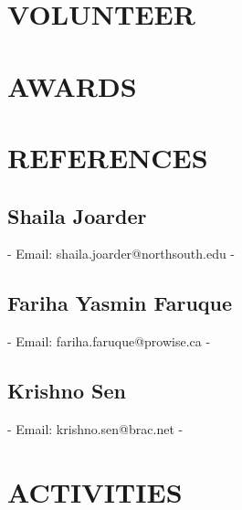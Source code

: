 \begin{minipage}[t]{0.36\textwidth}
    \section{VOLUNTEER} %
      
    \sectionsep

    \section{AWARDS} %
      
    \sectionsep

    \section{REFERENCES} %
      \subsection{Shaila Joarder}
      - Email: shaila.joarder@northsouth.edu \newline
      - 
    \sectionsep

    \subsection{Fariha Yasmin Faruque}
      - Email: fariha.faruque@prowise.ca \newline
      - 
    \sectionsep

    \subsection{Krishno Sen}
      - Email: krishno.sen@brac.net \newline
      - 
    \sectionsep
      
    \section{ACTIVITIES} %
      
    \sectionsep

\end{minipage} \hfill \begin{minipage}[t]{0.63\textwidth}


\end{minipage}
